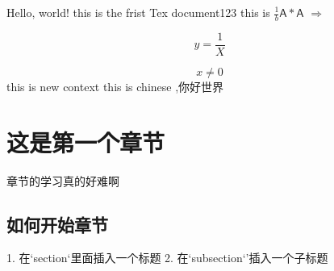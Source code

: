 \documentclass[UTF8]{ctexart}
\begin{document}
Hello, world!
this is the frist Tex document123
\newline
this is $\frac{1}{b} \mathsf{A} * \mathsf{A} $ $\Rightarrow$

$$y = \frac{1}{X}$$


$$x\neq 0$$
this is new context
\newline
this is chinese ,你好世界
\newpage

\section{这是第一个章节}
章节的学习真的好难啊
\subsection{如何开始章节}
1. 在`section`里面插入一个标题
2. 在`subsection`'插入一个子标题
\end{document}
